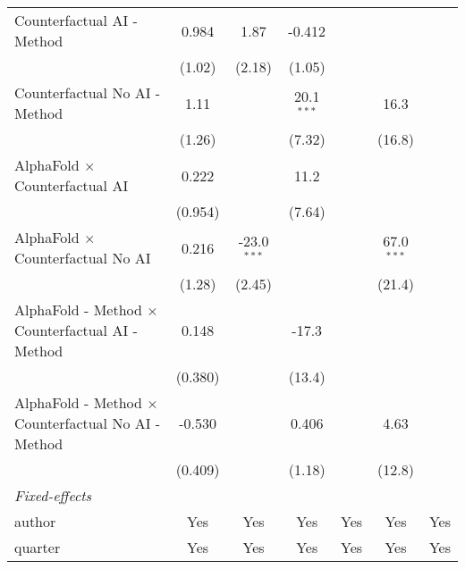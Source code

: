 \begin{tabular}{lcccccc}
   Counterfactual AI - Method                                 & 0.984        & 1.87          & -0.412       &           &               &   \\   
                                                              & (1.02)       & (2.18)        & (1.05)       &           &               &   \\   
   Counterfactual No AI - Method                              & 1.11         &               & 20.1$^{***}$ &           & 16.3          &   \\   
                                                              & (1.26)       &               & (7.32)       &           & (16.8)        &   \\   
   AlphaFold $\times$ Counterfactual AI                       & 0.222        &               & 11.2         &           &               &   \\   
                                                              & (0.954)      &               & (7.64)       &           &               &   \\   
   AlphaFold $\times$ Counterfactual No AI                    & 0.216        & -23.0$^{***}$ &              &           & 67.0$^{***}$  &   \\   
                                                              & (1.28)       & (2.45)        &              &           & (21.4)        &   \\   
   AlphaFold - Method $\times$ Counterfactual AI - Method     & 0.148        &               & -17.3        &           &               &   \\   
                                                              & (0.380)      &               & (13.4)       &           &               &   \\   
   AlphaFold - Method $\times$ Counterfactual No AI - Method  & -0.530       &               & 0.406        &           & 4.63          &   \\   
                                                              & (0.409)      &               & (1.18)       &           & (12.8)        &   \\   
   \midrule
   \emph{Fixed-effects}\\
   author                                                     & Yes          & Yes           & Yes          & Yes       & Yes           & Yes\\  
   quarter                                                    & Yes          & Yes           & Yes          & Yes       & Yes           & Yes\\  

\end{tabular}
